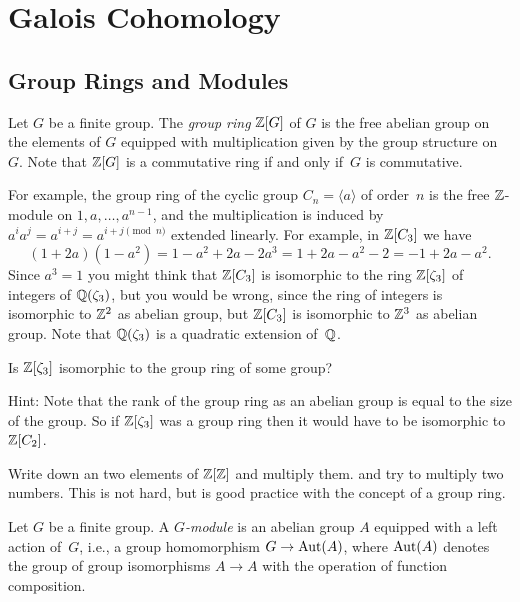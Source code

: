 \chapter{Galois Cohomology}\label{ch:gc}

\section{Group Rings and Modules}

\begin{definition}\label{def:groupring}
	Let $G$ be a finite group. The \emph{group ring} $\mathbb{Z}[G]$ of $G$
	is the free abelian group on the elements of $G$ equipped
	with multiplication given by the group structure on~$G$.
	Note that $\mathbb{Z}[G]$ is a commutative ring if and only if~$G$ is
	commutative.
\end{definition}

\begin{example}
	For example, the group ring of the cyclic group
	$C_n=\langle a\rangle$ of order~$n$ is
	the free $\mathbb{Z}$-module on $1,a,\ldots, a^{n-1}$, and the multiplication
	is induced by $a^i a^j = a^{i+j} = a^{i + j \pmod{n}}$ extended
	linearly. For example, in  $\mathbb{Z}[C_3]$ we have
	$$
	(1 + 2 a)(1 - a^2) = 1 - a^2 + 2a - 2 a^3
	= 1 + 2a - a^2 - 2 = -1 + 2a - a^2.
	$$
	Since $a^3 = 1$
	you might think that $\mathbb{Z}[C_3]$ is isomorphic to the ring $\mathbb{Z}[\zeta_3]$
	of integers of $\mathbb{Q}(\zeta_3)$, but you would be wrong, since the ring
	of integers is isomorphic to $\mathbb{Z}^2$ as abelian group, but $\mathbb{Z}[C_3]$
	is isomorphic to $\mathbb{Z}^3$ as abelian group. Note that $\mathbb{Q}(\zeta_3)$
	is a quadratic extension of~$\mathbb{Q}$.
\end{example}

\begin{exercise}
	Is $\mathbb{Z}[\zeta_3]$ isomorphic to the group ring of some group?
	
	Hint: Note that the rank of the group ring as an
	abelian group is equal to the size of the group.
	So if $\mathbb{Z}[\zeta_3]$ was a group ring then it would
	have to be isomorphic to $\mathbb{Z}[C_2]$.
\end{exercise}

\begin{exercise}
	Write down an two elements of $\mathbb{Z}[\mathbb{Z}]$ and multiply them.
	and try to multiply two numbers. This is not hard,
	but is good practice with the concept of a group
	ring.
\end{exercise}

\begin{definition}
	Let $G$ be a finite group. A \emph{$G$-module} is
	an abelian group $A$ equipped with a left action of~$G$,
	i.e., a group homomorphism $G\to\operatorname{Aut}(A)$, where $\operatorname{Aut}(A)$
	denotes the group of group isomorphisms $A\to A$ with
	the operation of function composition.
\end{definition}

